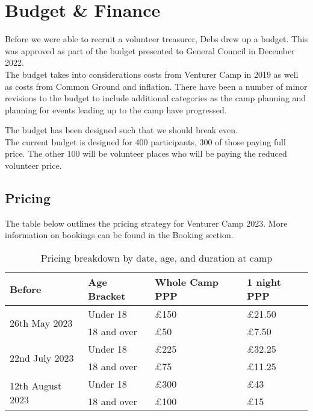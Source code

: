 \chapter{Budget \& Finance}

Before we were able to recruit a volunteer treasurer, Debs drew up a budget. This was approved as part of the budget presented to General Council in December 2022.\\

The budget takes into considerations costs from Venturer Camp in 2019 as well as costs from Common Ground and inflation. There have been a number of minor revisions to the budget to include additional categories as the camp planning and planning for events leading up to the camp have progressed.

The budget has been designed such that we should break even.\\

The current budget is designed for 400 participants, 300 of those paying full price. The other 100 will be volunteer places who will be paying the reduced volunteer price.\\

\section{Pricing}
The table below outlines the pricing strategy for Venturer Camp 2023. More information on bookings can be found in the Booking section.
\begin{table}[H]
    \begin{tabularx}{\textwidth}{XXXX}
        \textbf{Before} & \textbf{Age Bracket} & \textbf{Whole Camp PPP} & \textbf{1 night PPP}\\
        \hline
        \hline
        \multirow{2}{*}{26th May 2023} & Under 18 & £150 & £21.50\\
        \cline{2-4}
         & 18 and over & £50 & £7.50\\
        \hline
        \multirow{2}{*}{22nd July 2023} & Under 18 & £225 & £32.25\\
        \cline{2-4}
         & 18 and over & £75 & £11.25\\
        \hline
        \multirow{2}{*}{12th August 2023} & Under 18 & £300 & £43\\
        \cline{2-4}
         & 18 and over & £100 & £15\\
        \hline
    \end{tabularx}
    \caption{Pricing breakdown by date, age, and duration at camp}
\end{table}

